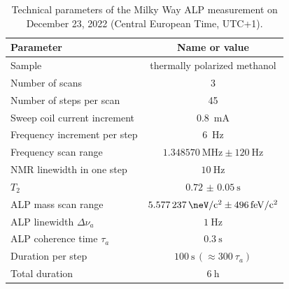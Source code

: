 \begin{table}[htb]
    \centering
    \caption{Technical parameters of the Milky Way ALP measurement on December 23, 2022 (Central European Time, UTC+1).  }
    \label{tab:MWALP-meas}
    \begin{tabular}{lc}
        \toprule
        Parameter & Name or value \\
        \hline
        Sample & thermally polarized methanol \\
        Number of scans & 3 \\
        Number of steps per scan & 45 \\
        Sweep coil current increment & \SI{0.8}{\mA} \\
        Frequency increment per step & \SI{6}{\Hz} \\
        Frequency scan range & $\SI{1.348570}{\MHz}\pm\SI{120}{\Hz}$ \\
        NMR linewidth in one step & $\SI{10}{\Hz}$ \\
        $T_2$ & $\SI{0.72(5)}{\s}$ \\
        ALP mass scan range & $\SI{5.577237}{\neV/c^2}\pm\SI{496}{\femto\eV/c^2}$ \\
        ALP linewidth $\Delta\nu_a$ & $\SI{1}{\Hz}$ \\
        ALP coherence time $\tau_a$ & $\SI{0.3}{\s}$ \\
        Duration per step & $\SI{100}{\s}\, (\approx \SI{300}{\tau_a})$ \\
        Total duration & $\SI{6}{\hour} $ \\
        \bottomrule
    \end{tabular}
\end{table}



